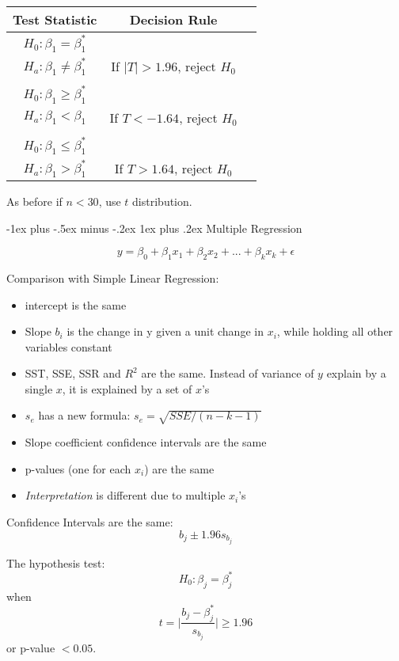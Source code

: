 \documentclass[10pt,landscape]{article}
\makeatletter
\renewcommand{\subsubsection}{\@startsection{subsubsection}{3}{0mm}%
                                {-1ex plus -.5ex minus -.2ex}%
                                {1ex plus .2ex}%
                                {\normalfont\small\bfseries}}
\makeatother
\begin{document}
\begin{multicols*}{3}
 \begin{tabular}{ c  c c }
Test Statistic & Decision Rule \\
\hline
$H_0 : \beta_1 = \beta_1^*$ \\      $H_a : \beta_1 \neq \beta_1^*$ & If $|T| > 1.96$, reject $H_0$ \\
 & \\
$H_0 : \beta_1 \geq \beta_1^*$ \\ $H_a : \beta_1 < \beta_1$      & If $T < -1.64$, reject $H_0$ \\
 & \\
$H_0 : \beta_1 \leq \beta_1^*$ \\ $H_a : \beta_1 > \beta_1^*$      & If $T > 1.64$, reject $H_0$ \\
\end{tabular}

As before if $n < 30$, use $t$ distribution. 



\subsubsection{Multiple Regression}

\[
y = \beta_0 + \beta_1 x_1 + \beta_2 x_2 + ... + \beta_k x_k + \epsilon
\]


Comparison with Simple Linear Regression:
\begin{itemize}
\item{intercept is the same}
\item{Slope $b_i$ is the change in y given a unit change in $x_i$, while holding all other variables constant}
\item{SST, SSE, SSR and $R^2$ are the same. Instead of variance of $y$ explain by a single $x$, it is explained by a set of $x$'s}
\item{$s_e$ has a new formula: $s_e = \sqrt{SSE / (n-k-1)} $}
\item{Slope coefficient confidence intervals are the same}
\item{p-values (one for each $x_i$) are the same}
\item{\textit{Interpretation} is different due to multiple $x_i$'s}
\end{itemize}
Confidence Intervals are the same:
\[
b_j \pm 1.96 s_{b_j}
\]

The hypothesis test:
\[
H_0 : \beta_j = \beta_j^*
\]
when 
\[
t = \Bigg\lvert \frac{b_j - \beta_j^*} { s_{b_j} } \Bigg\lvert \geq 1.96
\]
 or p-value $< 0.05$.
 

\end{multicols*}
\end{document}
